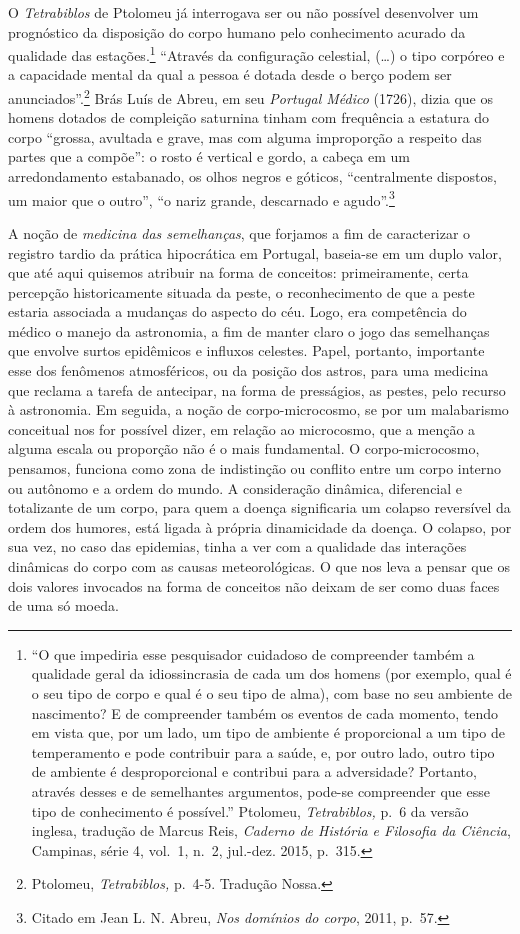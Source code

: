 O \emph{Tetrabiblos} de Ptolomeu já interrogava ser ou não possível
desenvolver um prognóstico da disposição do corpo humano pelo
conhecimento acurado da qualidade das estações.\footnote{``O que
  impediria esse pesquisador cuidadoso de compreender também a qualidade
  geral da idiossincrasia de cada um dos homens (por exemplo, qual é o
  seu tipo de corpo e qual é o seu tipo de alma), com base no seu
  ambiente de nascimento? E de compreender também os eventos de cada
  momento, tendo em vista que, por um lado, um tipo de ambiente é
  proporcional a um tipo de temperamento e pode contribuir para a saúde,
  e, por outro lado, outro tipo de ambiente é desproporcional e
  contribui para a adversidade? Portanto, através desses e de
  semelhantes argumentos, pode-se compreender que esse tipo de
  conhecimento é possível.'' Ptolomeu, \emph{Tetrabiblos,} p.~6 da
  versão inglesa, tradução de Marcus Reis, \emph{Caderno de História e
  Filosofia da Ciência}, Campinas, série 4, vol.~1, n.~2, jul.-dez.
  2015, p.~315.} ``Através da configuração celestial, (\ldots{}) o tipo
corpóreo e a capacidade mental da qual a pessoa é dotada desde o berço
podem ser anunciados''.\footnote{Ptolomeu, \emph{Tetrabiblos,} p.~4-5.
  Tradução Nossa.} Brás Luís de Abreu, em seu \emph{Portugal Médico}
(1726), dizia que os homens dotados de compleição saturnina tinham com
frequência a estatura do corpo ``grossa, avultada e grave, mas com
alguma improporção a respeito das partes que a compõe'': o rosto é
vertical e gordo, a cabeça em um arredondamento estabanado, os olhos
negros e góticos, ``centralmente dispostos, um maior que o outro'', ``o
nariz grande, descarnado e agudo''.\footnote{Citado em Jean L. N. Abreu,
  \emph{Nos domínios do corpo}, 2011, p.~57.}

A noção de \emph{medicina das semelhanças}, que forjamos a fim de
caracterizar o registro tardio da prática hipocrática em Portugal,
baseia-se em um duplo valor, que até aqui quisemos atribuir na forma de
conceitos: primeiramente, certa percepção historicamente situada da
peste, o reconhecimento de que a peste estaria associada a mudanças do
aspecto do céu. Logo, era competência do médico o manejo da astronomia,
a fim de manter claro o jogo das semelhanças que envolve surtos
epidêmicos e influxos celestes. Papel, portanto, importante esse dos
fenômenos atmosféricos, ou da posição dos astros, para uma medicina que
reclama a tarefa de antecipar, na forma de presságios, as pestes, pelo
recurso à astronomia. Em seguida, a noção de corpo-microcosmo, se por um
malabarismo conceitual nos for possível dizer, em relação ao microcosmo,
que a menção a alguma escala ou proporção não é o mais fundamental. O
corpo-microcosmo, pensamos, funciona como zona de indistinção ou
conflito entre um corpo interno ou autônomo e a ordem do mundo. A
consideração dinâmica, diferencial e totalizante de um corpo, para quem
a doença significaria um colapso reversível da ordem dos humores, está
ligada à própria dinamicidade da doença. O colapso, por sua vez, no caso
das epidemias, tinha a ver com a qualidade das interações dinâmicas do
corpo com as causas meteorológicas. O que nos leva a pensar que os dois
valores invocados na forma de conceitos não deixam de ser como duas
faces de uma só moeda.

